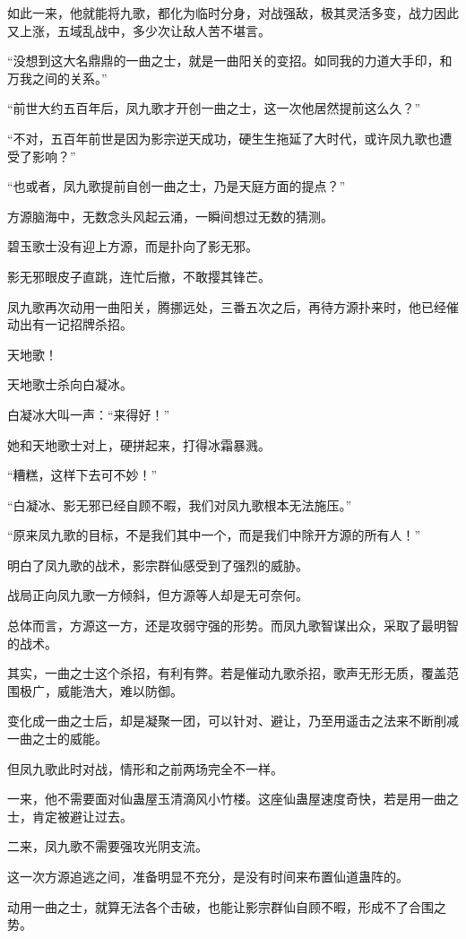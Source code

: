 \begin{this_body}
如此一来，他就能将九歌，都化为临时分身，对战强敌，极其灵活多变，战力因此又上涨，五域乱战中，多少次让敌人苦不堪言。

“没想到这大名鼎鼎的一曲之士，就是一曲阳关的变招。如同我的力道大手印，和万我之间的关系。”

“前世大约五百年后，凤九歌才开创一曲之士，这一次他居然提前这么久？”

“不对，五百年前世是因为影宗逆天成功，硬生生拖延了大时代，或许凤九歌也遭受了影响？”

“也或者，凤九歌提前自创一曲之士，乃是天庭方面的提点？”

方源脑海中，无数念头风起云涌，一瞬间想过无数的猜测。

碧玉歌士没有迎上方源，而是扑向了影无邪。

影无邪眼皮子直跳，连忙后撤，不敢撄其锋芒。

凤九歌再次动用一曲阳关，腾挪远处，三番五次之后，再待方源扑来时，他已经催动出有一记招牌杀招。

天地歌！

天地歌士杀向白凝冰。

白凝冰大叫一声：“来得好！”

她和天地歌士对上，硬拼起来，打得冰霜暴溅。

“糟糕，这样下去可不妙！”

“白凝冰、影无邪已经自顾不暇，我们对凤九歌根本无法施压。”

“原来凤九歌的目标，不是我们其中一个，而是我们中除开方源的所有人！”

明白了凤九歌的战术，影宗群仙感受到了强烈的威胁。

战局正向凤九歌一方倾斜，但方源等人却是无可奈何。

总体而言，方源这一方，还是攻弱守强的形势。而凤九歌智谋出众，采取了最明智的战术。

其实，一曲之士这个杀招，有利有弊。若是催动九歌杀招，歌声无形无质，覆盖范围极广，威能浩大，难以防御。

变化成一曲之士后，却是凝聚一团，可以针对、避让，乃至用遥击之法来不断削减一曲之士的威能。

但凤九歌此时对战，情形和之前两场完全不一样。

一来，他不需要面对仙蛊屋玉清滴风小竹楼。这座仙蛊屋速度奇快，若是用一曲之士，肯定被避让过去。

二来，凤九歌不需要强攻光阴支流。

这一次方源追逃之间，准备明显不充分，是没有时间来布置仙道蛊阵的。

动用一曲之士，就算无法各个击破，也能让影宗群仙自顾不暇，形成不了合围之势。


\end{this_body}

